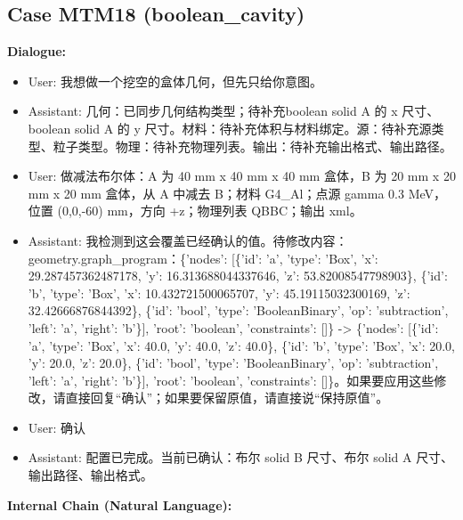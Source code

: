 \documentclass[11pt]{ctexart}
\begin{document}
\subsection{Case MTM18 (boolean\_cavity)}
\textbf{Dialogue:}
\begin{itemize}
\item User: 我想做一个挖空的盒体几何，但先只给你意图。
\item Assistant: 几何：已同步几何结构类型；待补充boolean solid A 的 x 尺寸、boolean solid A 的 y 尺寸。材料：待补充体积与材料绑定。源：待补充源类型、粒子类型。物理：待补充物理列表。输出：待补充输出格式、输出路径。
\item User: 做减法布尔体：A 为 40 mm x 40 mm x 40 mm 盒体，B 为 20 mm x 20 mm x 20 mm 盒体，从 A 中减去 B；材料 G4\_Al；点源 gamma 0.3 MeV，位置 (0,0,-60) mm，方向 +z；物理列表 QBBC；输出 xml。
\item Assistant: 我检测到这会覆盖已经确认的值。待修改内容：geometry.graph\_program：\{'nodes': [\{'id': 'a', 'type': 'Box', 'x': 29.287457362487178, 'y': 16.313688044337646, 'z': 53.82008547798903\}, \{'id': 'b', 'type': 'Box', 'x': 10.432721500065707, 'y': 45.19115032300169, 'z': 32.42666876844392\}, \{'id': 'bool', 'type': 'BooleanBinary', 'op': 'subtraction', 'left': 'a', 'right': 'b'\}], 'root': 'boolean', 'constraints': []\} -> \{'nodes': [\{'id': 'a', 'type': 'Box', 'x': 40.0, 'y': 40.0, 'z': 40.0\}, \{'id': 'b', 'type': 'Box', 'x': 20.0, 'y': 20.0, 'z': 20.0\}, \{'id': 'bool', 'type': 'BooleanBinary', 'op': 'subtraction', 'left': 'a', 'right': 'b'\}], 'root': 'boolean', 'constraints': []\}。如果要应用这些修改，请直接回复“确认”；如果要保留原值，请直接说“保持原值”。
\item User: 确认
\item Assistant: 配置已完成。当前已确认：布尔 solid B 尺寸、布尔 solid A 尺寸、输出路径、输出格式。
\end{itemize}
\textbf{Internal Chain (Natural Language):}
\end{document}

